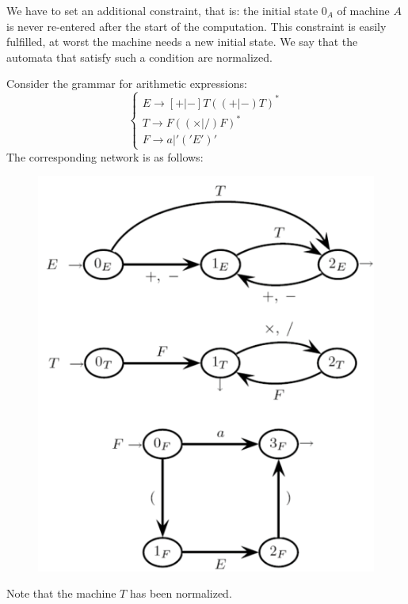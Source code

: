 We have to set an additional constraint, that is: the initial state $0_A$ of machine $A$ is never re-entered after the start of the computation. 
This constraint is easily fulfilled, at worst the machine needs a new initial state. 
We say that the automata that satisfy such a condition are normalized. 
\begin{example}
    Consider the grammar for arithmetic expressions: 
    \[
    \begin{cases}
        E \rightarrow [+|-]T((+|-)T)^{*} \\
        T \rightarrow F((\times|/)F)^{*} \\
        F \rightarrow a | '('E')'
    \end{cases}
    \]
    The corresponding network is as follows: 
    \begin{figure}[H]
        \centering
        \includegraphics[width=0.4\linewidth]{images/net.png}
    \end{figure}
    Note that the machine $T$ has been normalized. 
\end{example}

